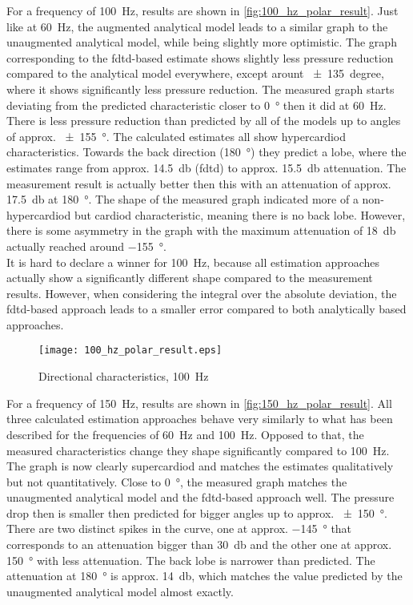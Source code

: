For a frequency of \SI{100}{\hertz}, results are shown in \autoref{fig:100_hz_polar_result}. Just like at \SI{60}{\hertz}, the augmented analytical model leads to a similar graph to the unaugmented analytical model, while being slightly more optimistic. The graph corresponding to the \gls{fdtd}-based estimate shows slightly less pressure reduction compared to the analytical model everywhere, except arount \SI{\pm 135}{degree}, where it shows significantly less pressure reduction. The measured graph starts deviating from the predicted characteristic closer to \SI{0}{\degree} then it did at \SI{60}{\hertz}. There is less pressure reduction than predicted by all of the models up to angles of approx. \SI{\pm 155}{\degree}. The calculated estimates all show hypercardiod characteristics. Towards the back direction (\SI{180}{\degree}) they predict a lobe, where the estimates range from approx. \SI{14.5}{\decibel} (\gls{fdtd}) to approx. \SI{15.5}{\decibel} attenuation. The measurement result is actually better then this with an attenuation of approx. \SI{17.5}{\decibel} at \SI{180}{\degree}. The shape of the measured graph indicated more of a non-hypercardiod but cardiod characteristic, meaning there is no back lobe. However, there is some asymmetry in the graph with the maximum attenuation of \SI{18}{\decibel} actually reached around \SI{-155}{\degree}.\\
It is hard to declare a winner for \SI{100}{\hertz}, because all estimation approaches actually show a significantly different shape compared to the measurement results. However, when considering the integral over the absolute deviation, the \gls{fdtd}-based approach leads to a smaller error compared to both analytically based approaches. 
\begin{figure}[H]
	\centering
	\texttt{[image: 100\_hz\_polar\_result.eps]}
	\caption{Directional characteristics, \SI{100}{\hertz}}
		\label{fig:100_hz_polar_result}
\end{figure}
For a frequency of \SI{150}{\hertz}, results are shown in \autoref{fig:150_hz_polar_result}.
All three calculated estimation approaches behave very similarly to what has been described for the frequencies of \SI{60}{\hertz} and \SI{100}{\hertz}. Opposed to that, the measured characteristics change they shape significantly compared to \SI{100}{\hertz}. The graph is now clearly supercardiod and matches the estimates qualitatively but not quantitatively.
Close to \SI{0}{\degree}, the measured graph matches the unaugmented analytical model and the \gls{fdtd}-based approach well. The pressure drop then is smaller then predicted for bigger angles up to approx. \SI{\pm 150}{\degree}. There are two distinct spikes in the curve, one at approx. \SI{-145}{\degree} that corresponds to an attenuation bigger than \SI{30}{\decibel} and the other one at approx. \SI{150}{\degree} with less attenuation. The back lobe is narrower than predicted. The attenuation at \SI{180}{\degree} is approx. \SI{14}{\decibel}, which matches the value predicted by the unaugmented analytical model almost exactly.\\
